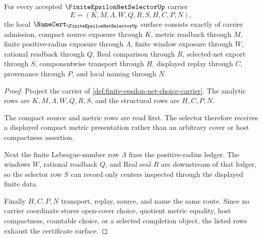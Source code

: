 \begin{theorem}\label{thm:finite-epsilon-net-choice-namecert-obligations}
For every accepted $\FiniteEpsilonNetSelectorUp$ carrier
$$
E=(K,M,\Lambda,W,Q,R,S,H,C,P,N),
$$
the local $\NameCert_{\FiniteEpsilonNetSelectorUp}$ surface consists exactly of carrier admission, compact source exposure through $K$, metric readback through $M$, finite positive-radius exposure through $\Lambda$, finite window exposure through $W$, rational readback through $Q$, Real comparison through $R$, selected-net export through $S$, componentwise transport through $H$, displayed replay through $C$, provenance through $P$, and local naming through $N$.
\end{theorem}
\begin{proof}
Project the carrier of \autoref{def:finite-epsilon-net-choice-carrier}. The analytic rows are $K,M,\Lambda,W,Q,R,S$, and the structural rows are $H,C,P,N$.

The compact source and metric rows are read first. The selector therefore receives a displayed compact metric presentation rather than an arbitrary cover or host compactness assertion.

Next the finite Lebesgue-number row $\Lambda$ fixes the positive-radius ledger. The windows $W$, rational readback $Q$, and Real seal $R$ are downstream of that ledger, so the selector row $S$ can record only centers inspected through the displayed finite data.

Finally $H,C,P,N$ transport, replay, source, and name the same route. Since no carrier coordinate stores open-cover choice, quotient metric equality, host compactness, countable choice, or a selected completion object, the listed rows exhaust the certificate surface.
\end{proof}

